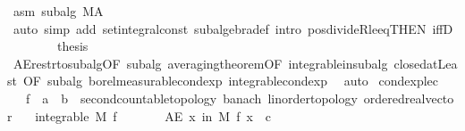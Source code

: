 \begin{isabellebody}
\ asm\ subalg\ M{\isacharunderscore}{\kern0pt}A\ \isamarkupfalse%
\ {\isacharparenleft}{\kern0pt}auto\ simp\ add{\isacharcolon}{\kern0pt}\ set{\isacharunderscore}{\kern0pt}integral{\isacharunderscore}{\kern0pt}const\ subalgebra{\isacharunderscore}{\kern0pt}def\ intro{\isacharbang}{\kern0pt}{\isacharcolon}{\kern0pt}\ pos{\isacharunderscore}{\kern0pt}divideR{\isacharunderscore}{\kern0pt}le{\isacharunderscore}{\kern0pt}eq{\isacharbrackleft}{\kern0pt}THEN\ iffD{}{\isacharbrackright}{\kern0pt}{\isacharparenright}{\kern0pt}\ \isanewline
\ \ \isacommand{{\isacharbraceright}{\kern0pt}}\isamarkupfalse%
\isanewline
\ \ \isamarkupfalse%
\ {\isacharquery}{\kern0pt}thesis\ \isamarkupfalse%
\ AE{\isacharunderscore}{\kern0pt}restr{\isacharunderscore}{\kern0pt}to{\isacharunderscore}{\kern0pt}subalg{\isacharbrackleft}{\kern0pt}OF\ subalg{\isacharbrackright}{\kern0pt}\ averaging{\isacharunderscore}{\kern0pt}theorem{\isacharbrackleft}{\kern0pt}OF\ integrable{\isacharunderscore}{\kern0pt}in{\isacharunderscore}{\kern0pt}subalg\ closed{\isacharunderscore}{\kern0pt}atLeast{\isacharcomma}{\kern0pt}\ OF\ subalg\ borel{\isacharunderscore}{\kern0pt}measurable{\isacharunderscore}{\kern0pt}cond{\isacharunderscore}{\kern0pt}exp\ integrable{\isacharunderscore}{\kern0pt}cond{\isacharunderscore}{\kern0pt}exp{\isacharbrackright}{\kern0pt}\ \isamarkupfalse%
\ auto\isanewline
{}\isamarkupfalse%
%
\endisatagproof
{\isafoldproof}%
%
\isadelimproof
\isanewline
%
\endisadelimproof
\isanewline
{}\isamarkupfalse%
\ cond{\isacharunderscore}{\kern0pt}exp{\isacharunderscore}{\kern0pt}le{\isacharunderscore}{\kern0pt}c{\isacharcolon}{\kern0pt}\isanewline
\ \ \ f\ {\isacharcolon}{\kern0pt}{\isacharcolon}{\kern0pt}\ {\isachardoublequoteopen}{\isacharprime}{\kern0pt}a\ {\isasymRightarrow}\ {\isacharprime}{\kern0pt}b\ {\isacharcolon}{\kern0pt}{\isacharcolon}{\kern0pt}\ {\isacharbraceleft}{\kern0pt}second{\isacharunderscore}{\kern0pt}countable{\isacharunderscore}{\kern0pt}topology{\isacharcomma}{\kern0pt}\ banach{\isacharcomma}{\kern0pt}\ linorder{\isacharunderscore}{\kern0pt}topology{\isacharcomma}{\kern0pt}\ ordered{\isacharunderscore}{\kern0pt}real{\isacharunderscore}{\kern0pt}vector{\isacharbraceright}{\kern0pt}{\isachardoublequoteclose}\isanewline
\ \ \ {\isachardoublequoteopen}integrable\ M\ f{\isachardoublequoteclose}\isanewline
\ \ \ \ \ \ \ {\isachardoublequoteopen}AE\ x\ in\ M{\isachardot}{\kern0pt}\ f\ x\ {\isasymle}\ c{\isachardoublequoteclose}\isanewline

\end{isabellebody}
